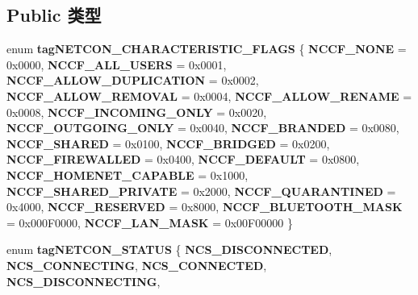 \subsection*{Public 类型}
\begin{DoxyCompactItemize}
\item 
\mbox{\label{interface_i_net_connection_a926b0d07437ca3673f3554097dca9ac0}} 
enum {\bfseries tag\+N\+E\+T\+C\+O\+N\+\_\+\+C\+H\+A\+R\+A\+C\+T\+E\+R\+I\+S\+T\+I\+C\+\_\+\+F\+L\+A\+GS} \{ \newline
{\bfseries N\+C\+C\+F\+\_\+\+N\+O\+NE} = 0x0000, 
{\bfseries N\+C\+C\+F\+\_\+\+A\+L\+L\+\_\+\+U\+S\+E\+RS} = 0x0001, 
{\bfseries N\+C\+C\+F\+\_\+\+A\+L\+L\+O\+W\+\_\+\+D\+U\+P\+L\+I\+C\+A\+T\+I\+ON} = 0x0002, 
{\bfseries N\+C\+C\+F\+\_\+\+A\+L\+L\+O\+W\+\_\+\+R\+E\+M\+O\+V\+AL} = 0x0004, 
\newline
{\bfseries N\+C\+C\+F\+\_\+\+A\+L\+L\+O\+W\+\_\+\+R\+E\+N\+A\+ME} = 0x0008, 
{\bfseries N\+C\+C\+F\+\_\+\+I\+N\+C\+O\+M\+I\+N\+G\+\_\+\+O\+N\+LY} = 0x0020, 
{\bfseries N\+C\+C\+F\+\_\+\+O\+U\+T\+G\+O\+I\+N\+G\+\_\+\+O\+N\+LY} = 0x0040, 
{\bfseries N\+C\+C\+F\+\_\+\+B\+R\+A\+N\+D\+ED} = 0x0080, 
\newline
{\bfseries N\+C\+C\+F\+\_\+\+S\+H\+A\+R\+ED} = 0x0100, 
{\bfseries N\+C\+C\+F\+\_\+\+B\+R\+I\+D\+G\+ED} = 0x0200, 
{\bfseries N\+C\+C\+F\+\_\+\+F\+I\+R\+E\+W\+A\+L\+L\+ED} = 0x0400, 
{\bfseries N\+C\+C\+F\+\_\+\+D\+E\+F\+A\+U\+LT} = 0x0800, 
\newline
{\bfseries N\+C\+C\+F\+\_\+\+H\+O\+M\+E\+N\+E\+T\+\_\+\+C\+A\+P\+A\+B\+LE} = 0x1000, 
{\bfseries N\+C\+C\+F\+\_\+\+S\+H\+A\+R\+E\+D\+\_\+\+P\+R\+I\+V\+A\+TE} = 0x2000, 
{\bfseries N\+C\+C\+F\+\_\+\+Q\+U\+A\+R\+A\+N\+T\+I\+N\+ED} = 0x4000, 
{\bfseries N\+C\+C\+F\+\_\+\+R\+E\+S\+E\+R\+V\+ED} = 0x8000, 
\newline
{\bfseries N\+C\+C\+F\+\_\+\+B\+L\+U\+E\+T\+O\+O\+T\+H\+\_\+\+M\+A\+SK} = 0x000\+F0000, 
{\bfseries N\+C\+C\+F\+\_\+\+L\+A\+N\+\_\+\+M\+A\+SK} = 0x00\+F00000
 \}
\item 
\mbox{\label{interface_i_net_connection_a85847d2adc938e7608ef14eaa1a329a2}} 
enum {\bfseries tag\+N\+E\+T\+C\+O\+N\+\_\+\+S\+T\+A\+T\+US} \{ \newline
{\bfseries N\+C\+S\+\_\+\+D\+I\+S\+C\+O\+N\+N\+E\+C\+T\+ED}, 
{\bfseries N\+C\+S\+\_\+\+C\+O\+N\+N\+E\+C\+T\+I\+NG}, 
{\bfseries N\+C\+S\+\_\+\+C\+O\+N\+N\+E\+C\+T\+ED}, 
{\bfseries N\+C\+S\+\_\+\+D\+I\+S\+C\+O\+N\+N\+E\+C\+T\+I\+NG}, 

\end{DoxyCompactItemize}

